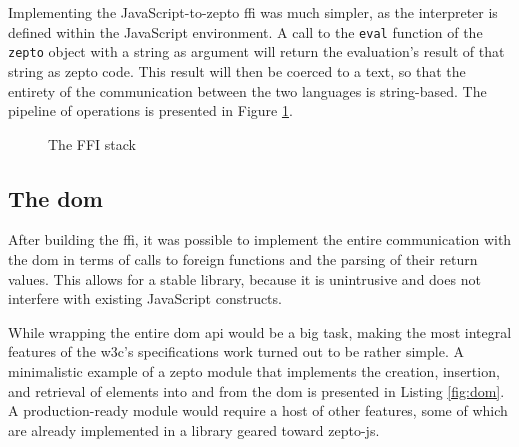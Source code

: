 \documentclass[oneside,11pt,xetex]{scrbook}
\begin{document}
Implementing the JavaScript-to-zepto \gls{ffi} was much simpler, as the
interpreter is defined within the JavaScript environment. A call to the
\texttt{eval} function of the \texttt{zepto} object with a string as argument
will return the evaluation's result of that string as zepto code. This result
will then be coerced to a text, so that the entirety of the communication between
the two languages is string-based. The pipeline of operations is presented
in Figure \ref{fig:graph}.

\begin{figure}[H]
\caption{The FFI stack}
\label{fig:graph}
\end{figure}

\subsection{The \gls{dom}}
\label{sec:DOM}

After building the \gls{ffi}, it was possible to implement the entire
communication with the \gls{dom} in terms of calls to foreign functions
and the parsing of their return values. This allows for a stable library,
because it is unintrusive and does not interfere with existing JavaScript
constructs.

While wrapping the entire \gls{dom} \gls{api} would be a big task, making
the most integral features of the \gls{w3c}'s specifications work turned
out to be rather simple. A minimalistic example of a zepto module
that implements the creation, insertion, and retrieval of elements into
and from the \gls{dom} is presented in Listing \ref{fig:dom}. A production-ready
module would require a host of other features, some of which are already
implemented in a library geared toward zepto-js.
\end{document}
